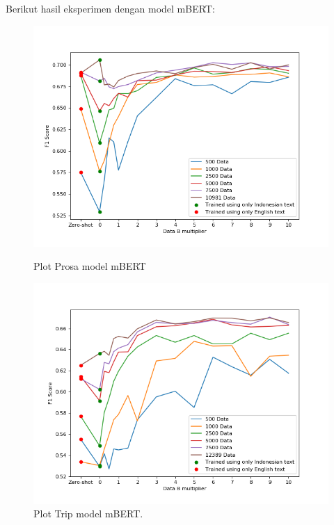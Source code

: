         Berikut hasil eksperimen dengan model mBERT: 

        \begin{figure}[ht]
              \includegraphics[width=\linewidth]{resources/plot-head-prosa-mbert.png}
              \caption{Plot Prosa model mBERT}\label{fig:plot_head_prosa_mbert}
            \endminipage\hfill
              \includegraphics[width=\linewidth]{resources/plot-head-trip-mbert.png}
              \caption{Plot Trip model mBERT.}\label{fig:plot_head_trip_mbert}
            \endminipage
        \end{figure}

